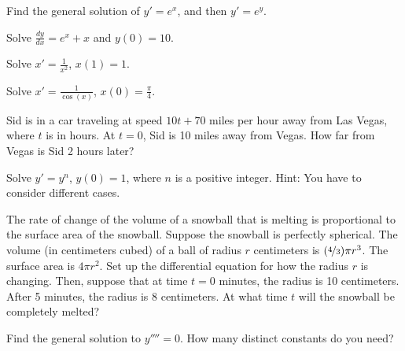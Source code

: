 \begin{exercise}
Find the general solution of
$y' = e^x$,  and then $y' = e^y$.
\end{exercise}


\setcounter{exercise}{100}

\begin{exercise}
Solve $\frac{dy}{dx} = e^x + x$ and $y(0) = 10$.
\end{exercise}

\begin{exercise}
Solve $x' = \frac{1}{x^2}$, $x(1)=1$.
\end{exercise}

\begin{exercise}
Solve $x' = \frac{1}{\cos(x)}$, $x(0)=\frac{\pi}{4}$.
\end{exercise}

\begin{exercise}
Sid is in a car traveling at speed $10t+70$ miles per hour away from Las Vegas,
where $t$ is in hours.  At $t=0$, Sid is 10 miles away from Vegas.  How
far from Vegas is Sid 2 hours later?
\end{exercise}

\begin{exercise}
Solve $y' = y^n$, $y(0) = 1$, where $n$ is a positive integer.
Hint: You have to consider different cases.
\end{exercise}

\begin{exercise}
The rate of change of the volume of a snowball that is melting is 
proportional to the surface area of the snowball.  Suppose the
snowball is perfectly spherical.  The volume (in centimeters cubed)
of a ball of radius $r$ centimeters is
$(\nicefrac{4}{3}) \pi r^3$.  The surface area is
$4 \pi r^2$.  Set up the differential equation for how the radius $r$ is changing.
Then, suppose that at time $t=0$ minutes, the radius is 10 centimeters.
After 5 minutes, the radius is 8 centimeters.  At what time $t$ will the 
snowball be completely melted?
\end{exercise}

\begin{exercise}
Find the general solution to $y''''= 0$.  How many distinct constants do you need?
\end{exercise}


